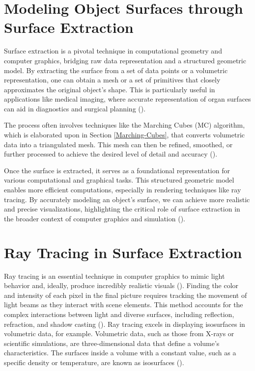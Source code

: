 \section{Modeling Object Surfaces through Surface Extraction} \label{Section 2.4}
Surface extraction is a pivotal technique in computational geometry and computer graphics, bridging raw data representation and a structured geometric model. By extracting the surface from a set of data points or a volumetric representation, one can obtain a mesh or a set of primitives that closely approximates the original object's shape. This is particularly useful in applications like medical imaging, where accurate representation of organ surfaces can aid in diagnostics and surgical planning (\cite{Lorensen_1987}).

The process often involves techniques like the Marching Cubes (MC) algorithm, which is elaborated upon in Section \ref{Marching-Cubes}, that converts volumetric data into a triangulated mesh. This mesh can then be refined, smoothed, or further processed to achieve the desired level of detail and accuracy (\cite{Newman_2006}).

Once the surface is extracted, it serves as a foundational representation for various computational and graphical tasks. This structured geometric model enables more efficient computations, especially in rendering techniques like ray tracing. By accurately modeling an object's surface, we can achieve more realistic and precise visualizations, highlighting the critical role of surface extraction in the broader context of computer graphics and simulation (\cite{Whitted_1980}).

\section{Ray Tracing in Surface Extraction} \label{Section 2.5}
Ray tracing is an essential technique in computer graphics to mimic light behavior and, ideally, produce incredibly realistic visuals (\cite{Glassner_1989}). Finding the color and intensity of each pixel in the final picture requires tracking the movement of light beams as they interact with scene elements. This method accounts for the complex interactions between light and diverse surfaces, including reflection, refraction, and shadow casting (\cite{Parker_1999}).
Ray tracing excels in displaying isosurfaces in volumetric data, for example. Volumetric data, such as those from X-rays or scientific simulations, are three-dimensional data that define a volume's characteristics. The surfaces inside a volume with a constant value, such as a specific density or temperature, are known as isosurfaces (\cite{Aaron_2007}).

